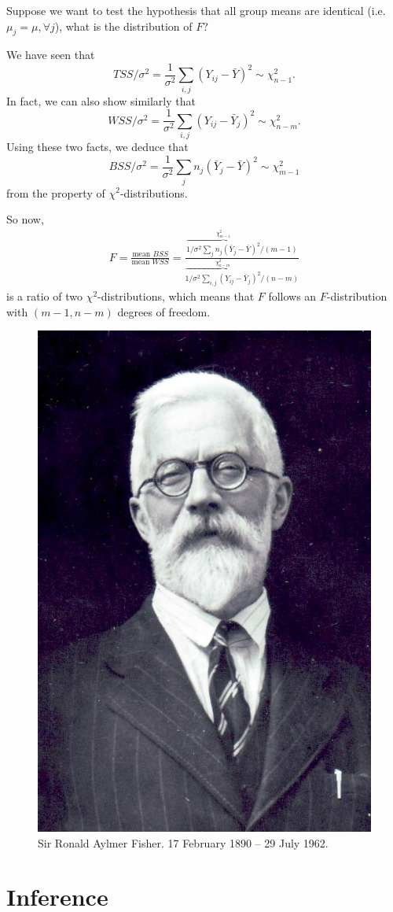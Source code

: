 \documentclass[
]{book}
\theoremstyle{definition}
\theoremstyle{definition}
\theoremstyle{definition}
\theoremstyle{definition}
\theoremstyle{remark}
\begin{document}
Suppose we want to test the hypothesis that all group means are identical (i.e.~\(\mu_j=\mu, \forall j\)), what is the distribution of \(F\)?

We have seen that
\[TSS/\sigma^2 = \frac{1}{\sigma^2}\sum_{i,j}(Y_{ij} - \bar Y)^2 \sim \chi^2_{n-1}.\]
In fact, we can also show similarly that
\[WSS/\sigma^2 =\frac{1}{\sigma^2}\sum_{i,j} (Y_{ij} - \bar Y_j)^2 \sim \chi^2_{n-m}.\]
Using these two facts, we deduce that
\[BSS/\sigma^2=\frac{1}{\sigma^2}\sum_{j} n_j(\bar Y_j - \bar Y)^2 \sim \chi^2_{m-1}\]
from the property of \(\chi^2\)-distributions.

So now, \[\begin{aligned}
    F = \frac{\text{mean }BSS}{\text{mean }WSS} = \frac{ \overbrace{1/\sigma^2\sum_{j} n_j(\bar Y_j - \bar Y)^2}^{\chi^2_{m-1}} / (m-1)}{ \overbrace{1/\sigma^2\sum_{i,j}(Y_{ij} - \bar Y_j)^2}^{\chi^2_{n-m}} / (n-m)}
  \end{aligned}\] is a ratio of two \(\chi^2\)-distributions, which means
that \(F\) follows an \(F\)-distribution with \((m-1,n-m)\) degrees of
freedom.

\begin{figure}

{\centering \includegraphics[width=0.5\linewidth]{figure/fisher} 

}

\caption{Sir Ronald Aylmer Fisher. 17 February 1890 -- 29 July 1962.}\label{fig:fisher}
\end{figure}

\hypertarget{part-inference}{%
\part{Inference}\label{part-inference}}
\end{document}
